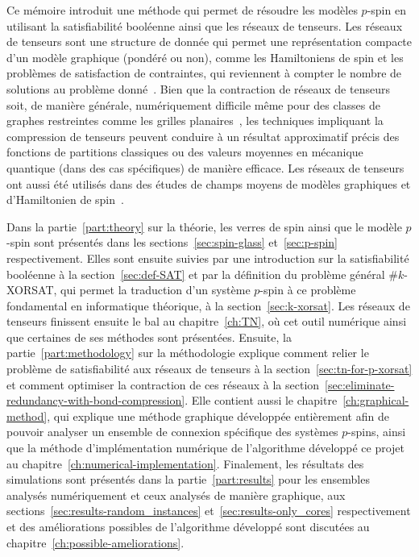 Ce mémoire introduit une méthode qui permet de résoudre les modèles $p$-spin en utilisant la satisfiabilité booléenne ainsi que les réseaux de tenseurs.
Les réseaux de tenseurs sont une structure de donnée qui permet une représentation compacte d'un modèle graphique (pondéré ou non), comme les Hamiltoniens de spin et les problèmes de satisfaction de contraintes, qui reviennent à compter le nombre de solutions au problème donné~\cite{garcia-saez_exact_2011, biamonte2015tensor, kourtis_fast_2019, Meichanetzidis_2019, de_beaudrap_tensor_2021}.
Bien que la contraction de réseaux de tenseurs soit, de manière générale, numériquement difficile même pour des classes de graphes restreintes comme les grilles planaires~\cite{schuch2007computational}, les techniques impliquant la compression de tenseurs peuvent conduire à un résultat approximatif précis des fonctions de partitions classiques ou des valeurs moyennes en mécanique quantique (dans des cas spécifiques) de manière efficace.
Les réseaux de tenseurs ont aussi été utilisés dans des études de champs moyens de modèles graphiques et d'Hamiltonien de spin~\cite{alkabetz2021tensor, pancotti2023one}.

Dans la partie~\ref{part:theory} sur la théorie, les verres de spin ainsi que le modèle $p$-spin sont présentés dans les sections~\ref{sec:spin-glass} et~\ref{sec:p-spin} respectivement.
Elles sont ensuite suivies par une introduction sur la satisfiabilité booléenne à la section~\ref{sec:def-SAT} et par la définition du problème général \#$k$-XORSAT, qui permet la traduction d'un système $p$-spin à ce problème fondamental en informatique théorique, à la section~\ref{sec:k-xorsat}.
Les réseaux de tenseurs finissent ensuite le bal au chapitre~\ref{ch:TN}, où cet outil numérique ainsi que certaines de ses méthodes sont présentées.
Ensuite, la partie~\ref{part:methodology} sur la méthodologie explique comment relier le problème de satisfiabilité aux réseaux de tenseurs à la section~\ref{sec:tn-for-p-xorsat} et comment optimiser la contraction de ces réseaux à la section~\ref{sec:eliminate-redundancy-with-bond-compression}.
Elle contient aussi le chapitre~\ref{ch:graphical-method}, qui explique une méthode graphique développée entièrement afin de pouvoir analyser un ensemble de connexion spécifique des systèmes $p$-spins, ainsi que la méthode d'implémentation numérique de l'algorithme développé ce projet au chapitre~\ref{ch:numerical-implementation}.
Finalement, les résultats des simulations sont présentés dans la partie~\ref{part:results} pour les ensembles analysés numériquement et ceux analysés de manière graphique, aux sections~\ref{sec:results-random_instances} et~\ref{sec:results-only_cores} respectivement et des améliorations possibles de l'algorithme développé sont discutées au chapitre~\ref{ch:possible-ameliorations}.

